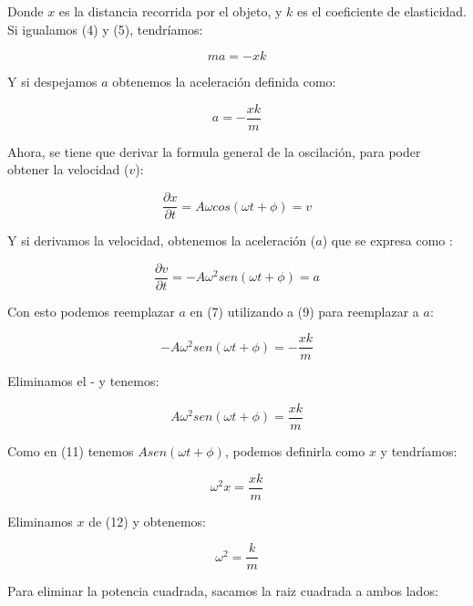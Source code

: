 \documentclass{article}
\begin{document}
Donde $x$ es la distancia recorrida por el objeto, y $k$ es el coeficiente de elasticidad.\\

Si igualamos (4) y (5), tendríamos:

\begin{equation}
    ma= -xk
\end{equation}

Y si despejamos $a$ obtenemos la aceleración definida como:

\begin{equation}
    a= -\frac{xk}{m}
\end{equation}

Ahora, se tiene que derivar la formula general de la oscilación, para poder obtener la velocidad ($v$):

\begin{equation}
    \frac{\partial x}{\partial t} = A\omega cos(\omega t + \phi) = v
\end{equation}

Y si derivamos la velocidad, obtenemos la aceleración ($a$) que se expresa como :

\begin{equation}
    \frac{\partial v}{\partial t} = -A\omega^2 sen(\omega t + \phi) = a
\end{equation}

Con esto podemos reemplazar $a$ en (7) utilizando a (9) para reemplazar a $a$:

\begin{equation}
    -A\omega^2 sen(\omega t + \phi) = -\frac{xk}{m}
\end{equation}

Eliminamos el - y tenemos:

\begin{equation}
    A\omega^2 sen(\omega t + \phi) = \frac{xk}{m}
\end{equation}

Como en (11) tenemos $Asen(\omega t + \phi)$, podemos definirla como $x$ y tendríamos:

\begin{equation}
    \omega^2 x = \frac{xk}{m}
\end{equation}

Eliminamos $x$ de (12) y obtenemos:

\begin{equation}
    \omega^2 = \frac{k}{m}
\end{equation}

Para eliminar la potencia cuadrada, sacamos la raiz cuadrada a ambos lados:
\end{document}
